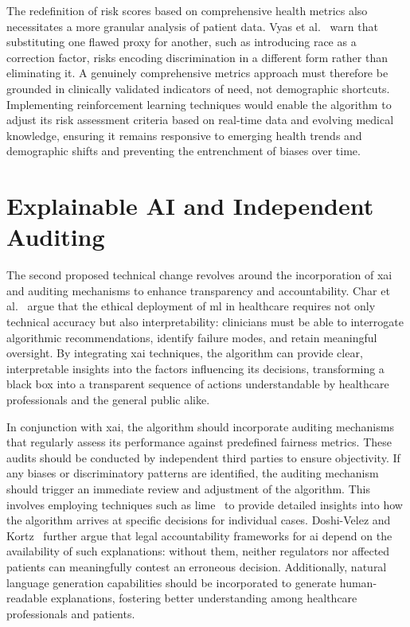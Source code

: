 \documentclass[11pt,showkeys]{essay}
\begin{document}
The redefinition of risk scores based on comprehensive health metrics also necessitates a more granular analysis of patient data. Vyas et al.~\cite{vyas_hidden_2020} warn that substituting one flawed proxy for another, such as introducing race as a correction factor, risks encoding discrimination in a different form rather than eliminating it. A genuinely comprehensive metrics approach must therefore be grounded in clinically validated indicators of need, not demographic shortcuts. Implementing reinforcement learning techniques would enable the algorithm to adjust its risk assessment criteria based on real-time data and evolving medical knowledge, ensuring it remains responsive to emerging health trends and demographic shifts and preventing the entrenchment of biases over time.

\section{Explainable AI and Independent Auditing}

The second proposed technical change revolves around the incorporation of \gls{xai} and auditing mechanisms to enhance transparency and accountability. Char et al.~\cite{char_implementing_2018} argue that the ethical deployment of \gls{ml} in healthcare requires not only technical accuracy but also interpretability: clinicians must be able to interrogate algorithmic recommendations, identify failure modes, and retain meaningful oversight. By integrating \gls{xai} techniques, the algorithm can provide clear, interpretable insights into the factors influencing its decisions, transforming a black box into a transparent sequence of actions understandable by healthcare professionals and the general public alike.

In conjunction with \gls{xai}, the algorithm should incorporate auditing mechanisms that regularly assess its performance against predefined fairness metrics. These audits should be conducted by independent third parties to ensure objectivity. If any biases or discriminatory patterns are identified, the auditing mechanism should trigger an immediate review and adjustment of the algorithm. This involves employing techniques such as \gls{lime}~\cite{ribeiro_why_2016} to provide detailed insights into how the algorithm arrives at specific decisions for individual cases. Doshi-Velez and Kortz~\cite{doshi-velez_accountability_2017} further argue that legal accountability frameworks for \gls{ai} depend on the availability of such explanations: without them, neither regulators nor affected patients can meaningfully contest an erroneous decision. Additionally, natural language generation capabilities should be incorporated to generate human-readable explanations, fostering better understanding among healthcare professionals and patients.
\end{document}
